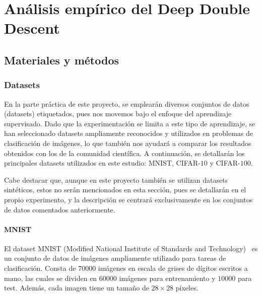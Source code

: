
\chapter{Análisis empírico del Deep Double Descent}\label{ch:analisis-empirico-ddd}

\section{Materiales y métodos}\label{sec:materiales-y-metodos}

\subsection{Datasets}\label{subsec:datasets}

En la parte práctica de este proyecto, se emplearán diversos conjuntos de datos (datasets) etiquetados, pues nos movemos bajo el enfoque del aprendizaje supervisado. Dado que la experimentación se limita a este tipo de aprendizaje, se han seleccionado datasets ampliamente reconocidos y utilizados en problemas de clasificación de imágenes, lo que también nos ayudará a comparar los resultados obtenidos con los de la comunidad científica. A continuación, se detallarán los principales datasets utilizados en este estudio: MNIST, CIFAR-$10$ y CIFAR-$100$.\newline

Cabe destacar que, aunque en este proyecto también se utilizan datasets sintéticos, estos no serán mencionados en esta sección, pues se detallarán en el propio experimento, y la descripción se centrará exclusivamente en los conjuntos de datos comentados anteriormente.\newline

\subsubsection{MNIST}\label{subsubsec:MNIST}

El dataset MNIST (Modified National Institute of Standards and Technology)~\cite{LeCun1998} es un conjunto de datos de imágenes ampliamente utilizado para tareas de clasificación. Consta de $70000$ imágenes en escala de grises de dígitos escritos a mano, las cuales se dividen en $60000$ imágenes para entrenamiento y $10000$ para test. Además, cada imagen tiene un tamaño de $28 \times 28$ píxeles.\newline

